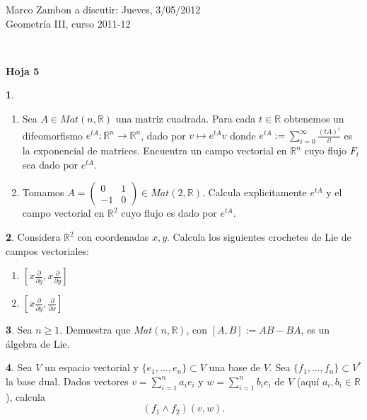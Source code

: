 \documentclass[12pt,a4paper]{report}
\theoremstyle{definition}
\newtheorem{ex}{}
\newcommand{\pd}[1]{\frac{\partial}{\partial #1}} %
\newcommand{\RR}{\ensuremath{\mathbb R}}
\begin{document}
\noindent
{\sffamily\large Marco Zambon 
\hfill   a discutir:   Jueves, 3/05/2012\\Geometr\'ia III, curso 2011-12}
 

\noindent
\hrulefill{}\\
\begin{center}\bfseries\large\textsf{Hoja 5    \vspace{-2mm}}
\end{center}

\noindent
 
 

\begin{ex}
\begin{enumerate}
\item   Sea $A\in Mat(n,\RR)$ una matriz cuadrada. Para cada $t\in \RR$ obtenemos un difeomorfismo 
$e^{tA} \colon \RR^n \to \RR^n$, dado por $v \mapsto e^{tA} v$ donde $e^{tA}:=\sum_{i=0}^{\infty}\frac{(tA)^i}{i!}$ es la exponencial de matrices.
  Encuentra un campo vectorial en $\RR^n$ cuyo flujo $F_t$ sea dado por $e^{tA}$.
  
\item  Tomamos $A=\left(\begin{array}{ccc}0 & 1  \\-1 & 0\end{array}\right) \in Mat(2,\RR)$. 
Calcula explicitamente $e^{tA}$ y el campo vectorial en $\RR^2$ cuyo flujo es dado por $e^{tA}$.
\end{enumerate}
\end{ex}

 \begin{ex}
  Considera $\RR^2$ con coordenadas $x,y$. Calcula los siguientes crochetes de Lie  de campos vectoriales:
\begin{enumerate}
\item $[x\pd{y},x\pd{y}]$ 
\item $[x\pd{y},\pd{x}]$
\end{enumerate}
\end{ex}


\begin{ex} 
Sea $n\ge 1$. Demuestra que $Mat(n,\RR)$, con $[A,B]:=AB-BA$, es un \'algebra de Lie. 
\end{ex}


 \begin{ex}
  Sea $V$ un espacio vectorial y $\{e_1,\dots,e_n\}\subset V$ una base de $V$. Sea $\{f_1,\dots,f_n\}\subset V^*$ la base dual. Dados vectores
$v=\sum_{i=1}^n a_i e_i$ y $w=\sum_{i=1}^n b_i e_i$ de $V$ (aqu\'i $a_i,b_i\in \RR$), calcula
$$(f_1\wedge f_2)(v,w).$$
 
\end{ex}
\end{document}
